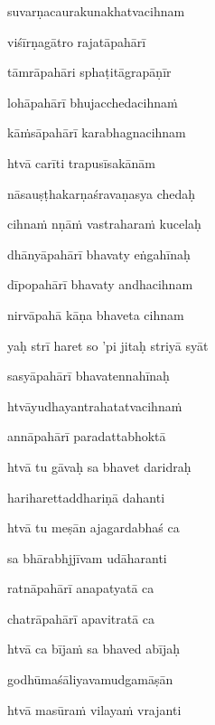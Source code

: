 \nemslokac 
suvarṇacaurakunakhatvacihnam
\dontdisplaylinenum

\nemslokad 
viśīrṇagātro rajatāpahārī \veg\dontdisplaylinenum

\ujvers\nemsloka 
tāmrāpahāri sphaṭitāgrapāṇīr
\dontdisplaylinenum

\nemslokab 
lohāpahārī bhujacchedacihna\.m \danda\dontdisplaylinenum

\nemslokac 
kā\.msāpahārī karabhagnacihnam
\dontdisplaylinenum

\nemslokad 
htvā carīti trapusīsakānām \veg\dontdisplaylinenum

\ujvers\nemsloka 
nāsauṣṭhakarṇaśravaṇasya chedaḥ
\dontdisplaylinenum

\nemslokab 
cihna\.m nṇā\.m vastrahara\.m kucelaḥ \danda\dontdisplaylinenum

\nemslokac 
dhānyāpahārī bhavaty eṅgahīnaḥ
\dontdisplaylinenum

\nemslokad 
dīpopahārī bhavaty andhacihnam \veg\dontdisplaylinenum

\ujvers\nemsloka 
nirvāpahā kāṇa bhaveta cihnam
\dontdisplaylinenum

\nemslokab 
yaḥ strī haret so 'pi jitaḥ striyā syāt \danda\dontdisplaylinenum

\nemslokac 
sasyāpahārī bhavatennahīnaḥ
\dontdisplaylinenum

\nemslokad 
htvāyudhayantrahatatvacihna\.m \veg\dontdisplaylinenum

\ujvers\nemsloka 
annāpahārī paradattabhoktā
\dontdisplaylinenum

\nemslokab 
htvā tu gāvaḥ sa bhavet daridraḥ \danda\dontdisplaylinenum

\nemslokac 
hariharettaddhariṇā dahanti
\dontdisplaylinenum

\nemslokad 
htvā tu meṣān ajagardabhaś ca \veg\dontdisplaylinenum

\ujvers\nemsloka 
sa bhārabhjjīvam udāharanti
\dontdisplaylinenum

\nemslokab 
ratnāpahārī anapatyatā ca \danda\dontdisplaylinenum

\nemslokac 
chatrāpahārī apavitratā ca
\dontdisplaylinenum

\nemslokad 
htvā ca bīja\.m sa bhaved abījaḥ \veg\dontdisplaylinenum

\ujvers\nemsloka 
godhūmaśāliyavamudgamāṣān
\dontdisplaylinenum

\nemslokab 
htvā masūra\.m vilaya\.m vrajanti \danda\dontdisplaylinenum

